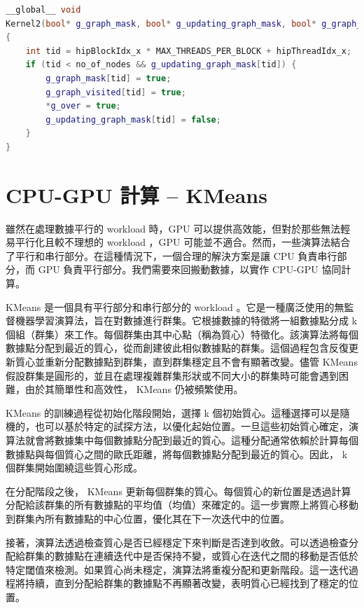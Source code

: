 {%
\lstset{style=mystyle}
\begin{lstlisting}[language=c++,caption={BFS的kernel2}]
__global__ void
Kernel2(bool* g_graph_mask, bool* g_updating_graph_mask, bool* g_graph_visited, bool* g_over, int no_of_nodes)
{
    int tid = hipBlockIdx_x * MAX_THREADS_PER_BLOCK + hipThreadIdx_x;
    if (tid < no_of_nodes && g_updating_graph_mask[tid]) {
        g_graph_mask[tid] = true;
        g_graph_visited[tid] = true;
        *g_over = true;
        g_updating_graph_mask[tid] = false;
    }
}
\end{lstlisting}
\section{CPU-GPU 計算 – KMeans}


雖然在處理數據平行的 workload 時，GPU 可以提供高效能，但對於那些無法輕易平行化且較不理想的 workload ，GPU 可能並不適合。然而，一些演算法結合了平行和串行部分。在這種情況下，一個合理的解決方案是讓 CPU 負責串行部分，而 GPU 負責平行部分。我們需要來回搬動數據，以實作 CPU-GPU 協同計算。


KMeans 是一個具有平行部分和串行部分的 workload 。它是一種廣泛使用的無監督機器學習演算法，旨在對數據進行群集。它根據數據的特徵將一組數據點分成 k 個組（群集）來工作。每個群集由其中心點（稱為質心）特徵化。該演算法將每個數據點分配到最近的質心，從而創建彼此相似數據點的群集。這個過程包含反復更新質心並重新分配數據點到群集，直到群集穩定且不會有顯著改變。儘管 KMeans 假設群集是圓形的，並且在處理複雜群集形狀或不同大小的群集時可能會遇到困難，由於其簡單性和高效性， KMeans 仍被頻繁使用。


KMeans 的訓練過程從初始化階段開始，選擇 k 個初始質心。這種選擇可以是隨機的，也可以基於特定的試探方法，以優化起始位置。一旦這些初始質心確定，演算法就會將數據集中每個數據點分配到最近的質心。這種分配通常依賴於計算每個數據點與每個質心之間的歐氏距離，將每個數據點分配到最近的質心。因此， k 個群集開始圍繞這些質心形成。


在分配階段之後， KMeans 更新每個群集的質心。每個質心的新位置是透過計算分配給該群集的所有數據點的平均值（均值）來確定的。這一步實際上將質心移動到群集內所有數據點的中心位置，優化其在下一次迭代中的位置。


接著，演算法透過檢查質心是否已經穩定下來判斷是否達到收斂。可以透過檢查分配給群集的數據點在連續迭代中是否保持不變，或質心在迭代之間的移動是否低於特定閾值來檢測。如果質心尚未穩定，演算法將重複分配和更新階段。這一迭代過程將持續，直到分配給群集的數據點不再顯著改變，表明質心已經找到了穩定的位置。


}
